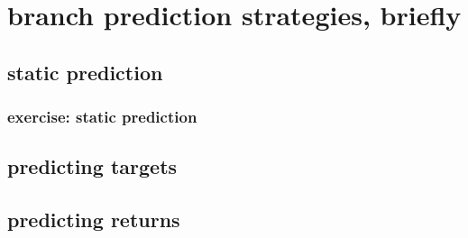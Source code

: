 \section{branch prediction strategies, briefly}

\subsection{static prediction}


\subsubsection{exercise: static prediction}


\subsection{predicting targets}


\subsection{predicting returns}


